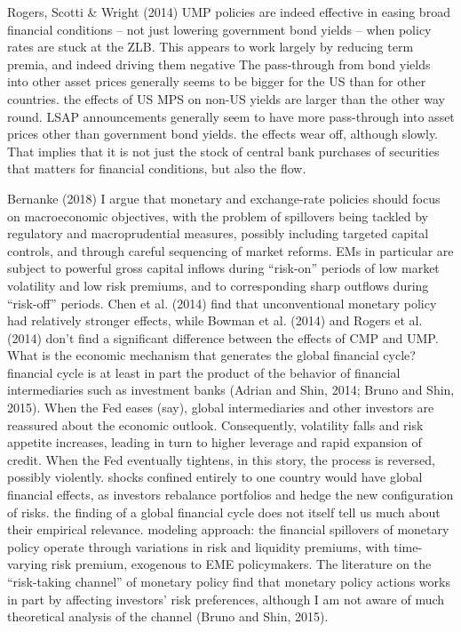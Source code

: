 Rogers, Scotti \& Wright (2014)
UMP policies are indeed effective in easing broad financial conditions – not just lowering government bond yields – when policy rates are stuck at the ZLB.
This appears to work largely by reducing term premia, and indeed driving them negative
The pass-through from bond yields into other asset prices generally seems to be bigger for the US than for other countries.
the effects of US MPS on non-US yields are larger than the other way round.
LSAP announcements generally seem to have more pass-through into asset prices other than government bond yields.
the effects wear off, although slowly. That implies that it is not just the stock of central bank purchases of securities that matters for financial conditions, but
also the flow.


Bernanke (2018)
I argue that monetary and exchange-rate policies should focus on macroeconomic objectives, with the problem of spillovers being tackled by regulatory and macroprudential measures, possibly including targeted capital controls, and through careful sequencing of market reforms. 
EMs in particular are subject to powerful gross capital inflows during “risk-on” periods of low market volatility and low risk premiums, and to corresponding sharp outflows during “risk-off” periods. 
Chen et al. (2014) find that unconventional monetary policy had relatively stronger effects, while Bowman et al. (2014) and Rogers et al. (2014) don’t find a significant difference between the effects of CMP and UMP. 
What is the economic mechanism that generates the global financial cycle? financial
cycle is at least in part the product of the behavior of financial intermediaries such as investment banks (Adrian and Shin, 2014; Bruno and Shin, 2015).
When the Fed eases (say), global intermediaries and other investors are reassured about the economic outlook. Consequently, volatility falls and risk appetite increases, leading in turn to higher leverage and rapid expansion of credit. When the Fed eventually tightens, in this story, the process is reversed, possibly violently. 
shocks confined entirely to one country would have global financial effects, as investors rebalance portfolios and hedge the new configuration of risks.
the finding of a global financial cycle does not itself tell us much about their empirical relevance. 
modeling approach: the financial spillovers of monetary policy operate through variations in risk and liquidity premiums, with time-varying risk premium, exogenous to EME policymakers.
The literature on the “risk-taking channel” of monetary policy find that monetary policy actions works in part by affecting investors’ risk preferences, although I am not aware of much theoretical analysis of the channel (Bruno and Shin, 2015). 
